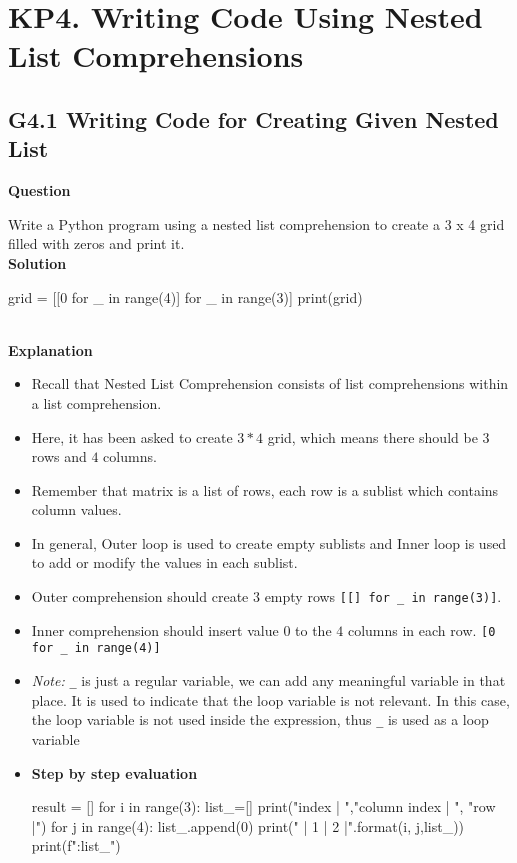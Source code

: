 \documentclass[10pt]{extarticle}
\begin{document}
\section*{KP4. Writing Code Using Nested List Comprehensions}
\subsection*{G4.1 Writing Code for Creating Given Nested List}

\textbf{Question}

Write a Python program using a nested list comprehension to create a 3 x 4 grid filled with zeros and print it. \\

\noindent\textbf{Solution}

\begin{python}
grid = [[0 for _ in range(4)] for _ in range(3)]
print(grid)
\end{python}  \\

\noindent\textbf{Explanation}

\begin{itemize}
    \item Recall that Nested List Comprehension consists of list comprehensions within a list comprehension.
    \item Here, it has been asked to create $ 3*4$ grid, which means there should be $3$ rows and $4$ columns. 
    \item Remember that matrix is a list of rows, each row is a sublist which contains column values.
    \item In general, Outer loop is used to create empty sublists and Inner loop is used to add or modify the values in each sublist. 
    \item Outer comprehension should create $3$ empty rows  \colorbox{gray!20}{\texttt{[[] for \_ in range(3)]}}.
    \item Inner comprehension should insert value $0$ to the $4$ columns in each row.  \colorbox{gray!20}{\texttt{[0 for \_ in range(4)]}} 
    \item \textit{Note:} \texttt{\_} is just a regular variable, we can add any meaningful variable in that place. It is used to indicate that the loop variable is not relevant. In this case, the loop variable is not used inside the expression, thus \texttt{\_} is used as a loop variable
    \item \textbf{Step by step evaluation}
    \begin{tcolorbox}[colback=gray!20, colframe=gray!50, sharp corners=southwest]
    \begin{pycode}
result = []
for i in range(3):
  list_=[]
  print("\nrow index | ","column index | ", "row |")
  for j in range(4):
      list_.append(0)
      print("  |  {1}  |  {2}  |".format(i, j,list_))
  print(f"\nRow:{list_}")   

    \end{pycode}
    \end{tcolorbox}
\end{itemize}
\end{document}
